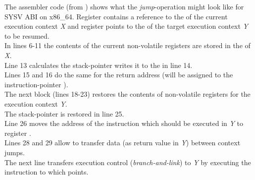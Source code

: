 \label{appendix}

The assembler code (from \boostcontext) shows what the \textit{jump}-operation
might look like for SYSV ABI on x86\_64.
Register  contains a reference to the \cblock of the current execution
context \textit{X} and register  points to the \cblock of the target execution
context \textit{Y} to be resumed.\\
\newline
In lines 6-11 the contents of the current non-volatile registers are stored in the
\cblock of \textit{X}.\\
Line 13 calculates the stack-pointer writes it to the \cblock in line 14.\\
Lines 15 and 16 do the same for the return address (will be assigned to the
instruction-pointer ).\\
\newline
The next block (lines 18-23) restores the contents of non-volatile registers for
the execution context \textit{Y}.\\
The stack-pointer is restored in line 25.\\
Line 26 moves the address of the instruction which should be executed in
\textit{Y} to register .\\
\newline
Lines 28 and 29 allow to transfer data (as return value in \textit{Y}) between
context jumps.\\
\newline
The next line transfers execution control (\textit{branch-and-link}) to
\textit{Y} by executing the instruction to which  points.
